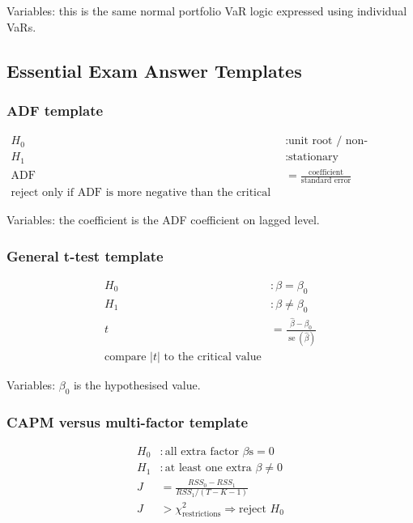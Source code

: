 \documentclass[
  8pt,
  twocolumn]{extarticle}
\begin{document}
Variables: this is the same normal portfolio VaR logic expressed using
individual VaRs.

\subsection{Essential Exam Answer
Templates}\label{essential-exam-answer-templates}

\subsubsection{ADF template}\label{adf-template}

\[
\begin{aligned}
H_0&:\text{unit root / non-stationary}\\
H_1&:\text{stationary}\\
\operatorname{ADF}&=\frac{\text{coefficient}}{\text{standard error}}\\
\text{reject only if ADF is more negative than the critical value}
\end{aligned}
\]

Variables: the coefficient is the ADF coefficient on lagged level.

\subsubsection{General t-test template}\label{general-t-test-template}

\[
\begin{aligned}
H_0&:\beta=\beta_0\\
H_1&:\beta\ne\beta_0\\
t&=\frac{\hat\beta-\beta_0}{\operatorname{se}(\hat\beta)}\\
\text{compare }|t|\text{ to the critical value}
\end{aligned}
\]

Variables: \(\beta_0\) is the hypothesised value.

\subsubsection{CAPM versus multi-factor
template}\label{capm-versus-multi-factor-template}

\[
\begin{aligned}
H_0&:\text{all extra factor }\beta\text{s}=0\\
H_1&:\text{at least one extra }\beta\ne0\\
J&=\frac{RSS_0-RSS_1}{RSS_1/(T-K-1)}\\
J&>\chi^2_{\text{restrictions}}\Rightarrow\text{reject }H_0
\end{aligned}
\]
\end{document}
